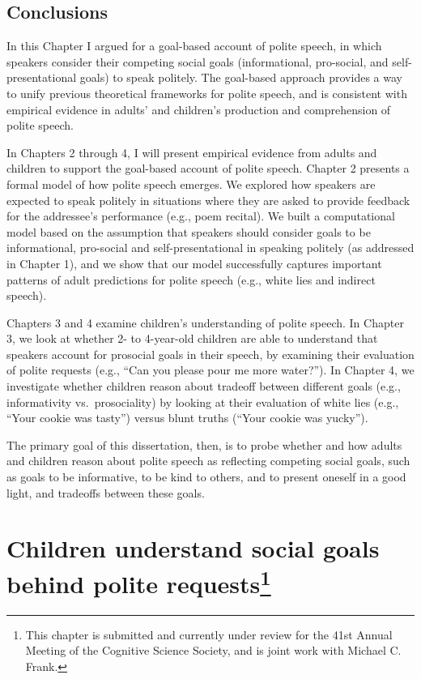 \documentclass[oneside]{report}
\begin{document}
\section{Conclusions}\label{conclusions}

In this Chapter I argued for a goal-based account of polite speech, in
which speakers consider their competing social goals (informational,
pro-social, and self-presentational goals) to speak politely. The
goal-based approach provides a way to unify previous theoretical
frameworks for polite speech, and is consistent with empirical evidence
in adults' and children's production and comprehension of polite speech.

In Chapters 2 through 4, I will present empirical evidence from adults
and children to support the goal-based account of polite speech. Chapter
2 presents a formal model of how polite speech emerges. We explored how
speakers are expected to speak politely in situations where they are
asked to provide feedback for the addressee's performance (e.g., poem
recital). We built a computational model based on the assumption that
speakers should consider goals to be informational, pro-social and
self-presentational in speaking politely (as addressed in Chapter 1),
and we show that our model successfully captures important patterns of
adult predictions for polite speech (e.g., white lies and indirect
speech).

Chapters 3 and 4 examine children's understanding of polite speech. In
Chapter 3, we look at whether 2- to 4-year-old children are able to
understand that speakers account for prosocial goals in their speech, by
examining their evaluation of polite requests (e.g., ``Can you please
pour me more water?''). In Chapter 4, we investigate whether children
reason about tradeoff between different goals (e.g., informativity
vs.~prosociality) by looking at their evaluation of white lies (e.g.,
``Your cookie was tasty'') versus blunt truths (``Your cookie was
yucky'').

The primary goal of this dissertation, then, is to probe whether and how
adults and children reason about polite speech as reflecting competing
social goals, such as goals to be informative, to be kind to others, and
to present oneself in a good light, and tradeoffs between these goals.

\chapter[Children understand social goals behind polite
requests]{\texorpdfstring{Children understand social goals behind polite
requests\footnote{This chapter is submitted and currently under review
  for the 41st Annual Meeting of the Cognitive Science Society, and is
  joint work with Michael C. Frank.}}{Children understand social goals behind polite requests}}\label{children-understand-social-goals-behind-polite-requests}
\end{document}
